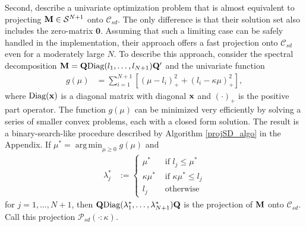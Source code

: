 \documentclass[11pt]{article}
\newcommand{\R}{\mathbb{R}}
\DeclareMathOperator*{\argmin}{arg\,min}
\theoremstyle{definition}
\theoremstyle{definition}
\def\x{{\bf x}}
\def\M{{\bf M}}
\def\Q{{\bf Q}}
\def\Diag{\text{Diag}}
\begin{document}
Second, \cite{tanaka2014positive} describe a univariate optimization problem that is almost equivalent to projecting $\M \in \mathcal{S}^{N+1}$ onto $\mathcal{C}_{sd}$. The only difference is that their solution set also includes the zero-matrix $\boldsymbol{0}$. Assuming that such a limiting case can be safely handled in the implementation, their approach offers a fast projection onto  $\mathcal{C}_{sd}$ even for a moderately large $N$. To describe this approach, consider the spectral decomposition $\M = \Q \Diag(l_1, \dots, l_{N+1}) \Q'$ and the univariate function 
\begin{align*}
g(\mu) &= \sum_{i=1}^{N+1} \left[ \left(\mu-l_i\right)^2_+ + \left(l_i - \kappa\mu\right)^2_+ \right],
\end{align*}
where $\Diag(\x)$ is a diagonal matrix with diagonal $\x$ and $(\cdot)_+$ is the positive part operator. The function $g(\mu)$ can be minimized very efficiently by solving a series of smaller convex problems, each with a closed form solution. The result is a binary-search-like procedure described by Algorithm \ref{projSD_algo} in the Appendix.
If $\mu^* = \argmin_{\mu \geq 0} g(\mu)$ and 
\begin{align*}
\lambda_j^* &:= \begin{cases}
\mu^* & \text{ if } l_j \leq \mu^*\\
\kappa \mu^* & \text{ if } \kappa \mu^*  \leq l_j\\
l_j & \text{ otherwise}
\end{cases}
\end{align*}
for $j = 1, \dots, N+1$,  then $\Q \Diag(\lambda_1^*, \dots, \lambda_{N+1}^*) \Q$ is the projection of $\M$ onto $\mathcal{C}_{sd}$. Call this projection $\mathcal{P}_{sd}(\cdot : \kappa)$. 
\end{document}
